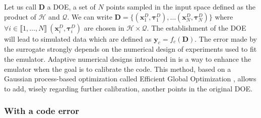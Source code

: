 \documentclass[soumission]{jsfds}
\newcommand{\PB}[1]{\textcolor{green}{PB: #1}}
\begin{document}
Let us call $\boldsymbol{D}$ a DOE, a set of $N$ points sampled in the input space defined as the product of $\mathcal{H}$ and $\mathcal{Q}$. We can write $\boldsymbol{D}=\{ (\boldsymbol{x}_1^D,\boldsymbol{\tau}_1^D),\dots (\boldsymbol{x}_N^D,\boldsymbol{\tau}_N^D) \}$ where $\forall i \in \llbracket1,\dots,N\rrbracket \  (\boldsymbol{x}_i^D,\boldsymbol{\tau}_i^D)$ are chosen in $\mathcal{H}\times \mathcal{Q}$.
The establishment of the DOE will lead to simulated data which are defined as $\boldsymbol{y}_c=f_c(\boldsymbol{D})$. The error made by the surrogate strongly depends on the numerical design of experiments used to fit the emulator. Adaptive numerical designs introduced in \citet{damblin2018} is a way to enhance the emulator when the goal is to calibrate the code. This method, based on a Gaussian process-based optimization called Efficient Global Optimization \citep{jones1998efficient}, allows to add, wisely regarding further calibration, another points in the original DOE. \newline


\subsubsection{With a code error}
\end{document}
